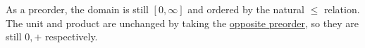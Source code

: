 As a preorder, the domain is still $[0,\infty]$ and ordered by the natural $\leq$ relation.  The unit and product are unchanged by taking the \href{doc/1 math/Seven Sketches in Compositionality/Chapter 1: Generative Effects/3 Preorders/Opposite preorder}{opposite preorder}, so they are still $0, +$ respectively.
